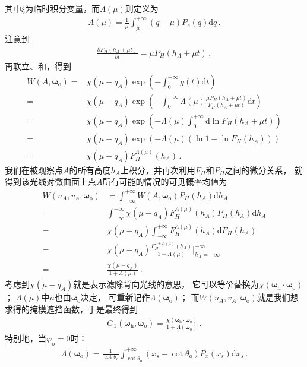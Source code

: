 其中$\xi$为临时积分变量，而$\Lambda(\mu)$则定义为
\begin{align}
    \Lambda(\mu)=\frac{1}{\mu}\int_{\mu}^{+\infty}(q-\mu)P_s(q)\mathrm{d}q\, .
\end{align}
注意到
\begin{align}
    \frac{\partial F_H(h_A+\mu t)}{\partial t}=\mu P_H(h_A+\mu t)\, ,
\end{align}
再联立、和，得到
\begin{align}
    W(A,{\bm\omega}_{\mathrm{o}})=&\chi(\mu-q_A)\exp\left(-\int_{0}^{+\infty}g(t)\mathrm{d}t\right)\nonumber\\
    =&\chi(\mu-q_A)\exp\left(-\int_{0}^{+\infty}\Lambda(\mu)\frac{\mu P_H(h_A+\mu t)}{F_H(h_A+\mu t)}\mathrm{d}t\right)\nonumber\\
    =&\chi(\mu-q_A)\exp\left(-\Lambda(\mu)\int_{0}^{+\infty}\mathrm{d}\ln F_H(h_A+\mu t)\right)\nonumber\\
    =&\chi(\mu-q_A)\exp\left(-\Lambda(\mu)(\ln 1 - \ln F_H(h_A))\right)\nonumber\\
    =&\chi(\mu-q_A)F_H^{\Lambda(\mu)}(h_A)\, .
\end{align}
我们在被观察点$A$的所有高度$h_A$上积分，并再次利用$F_H$和$P_H$之间的微分关系，
就得到该光线对微曲面上点$A$所有可能的情况的可见概率均值为
\begin{align}\label{eq:08ex01-AverageVisibleProbability}
    W(u_A,v_A,{\bm\omega}_{\mathrm{o}})&=\int_{-\infty}^{+\infty}W(A,{\bm\omega}_{\mathrm{o}})P_H(h_A)\mathrm{d}h_A\nonumber\\
    =&\int_{-\infty}^{+\infty}\chi(\mu-q_A)F_H^{\Lambda(\mu)}(h_A)P_H(h_A)\mathrm{d}h_A\nonumber\\
    =&\chi(\mu-q_A)\int_{-\infty}^{+\infty}F_H^{\Lambda(\mu)}(h_A)\mathrm{d}F_H(h_A)\nonumber\\
    =&\chi(\mu-q_A)\frac{F_H^{1+\Lambda(\mu)}(h_A)}{1+\Lambda(\mu)}\bigg|_{h_A=-\infty}^{+\infty}\nonumber\\
    =&\frac{\chi(\mu-q_A)}{1+\Lambda(\mu)}\, .
\end{align}
考虑到$\chi(\mu-q_A)$就是表示滤除背向光线的意思，
它可以等价替换为$\chi({\bm\omega}_{\mathrm{h}}\cdot{\bm\omega}_{\mathrm{o}})$；
$\Lambda(\mu)$中$\mu$也由${\bm\omega}_{\mathrm{o}}$决定，
可重新记作$\Lambda({\bm\omega}_{\mathrm{o}})$；
而$W(u_A,v_A,{\bm\omega}_{\mathrm{o}})$就是我们想求得的掩模遮挡函数，于是最终得到
\begin{align}\label{eq:08-ex01-Smith-masking-function}
    G_1({\bm\omega}_{\mathrm{h}},{\bm\omega}_{\mathrm{o}})
    =\frac{\chi({\bm\omega}_{\mathrm{h}}\cdot{\bm\omega}_{\mathrm{o}})}
    {1+\Lambda({\bm\omega}_{\mathrm{o}})}\, .
\end{align}
特别地，当$\varphi_{\mathrm{o}}=0$时：
\begin{align}\label{eq:08-ex01-Lambda-function}
    \Lambda({\bm\omega}_{\mathrm{o}})=\frac{1}{\cot\theta_{\mathrm{o}}}
    \int_{\cot\theta_{\mathrm{o}}}^{+\infty}(x_s-\cot\theta_{\mathrm{o}})P_x(x_s)\mathrm{d}x_s\, .
\end{align}

